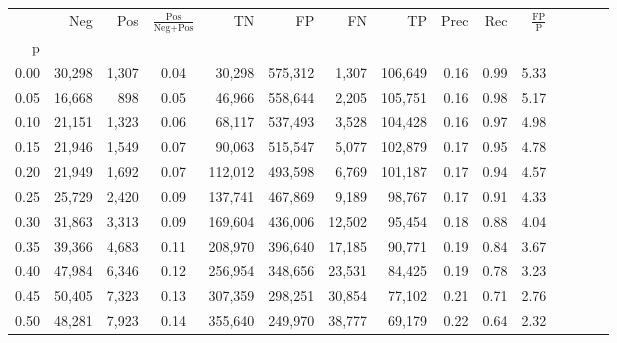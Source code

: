 \begin{tabular}{rrrcrrrrrrrrrrr}
\toprule
{} &     Neg &    Pos & $\frac{\text{Pos}}{\text{Neg}+\text{Pos}}$ &       TN &       FP &       FN &       TP &  Prec &   Rec & $\frac{\text{FP}}{\text{P}}$ \\
p    &         &        &                                            &          &          &          &          &       &       &                              \\
\midrule
0.00 &  30,298 &  1,307 &                                       0.04 &   30,298 &  575,312 &    1,307 &  106,649 &  0.16 &  0.99 &                         5.33 \\
0.05 &  16,668 &    898 &                                       0.05 &   46,966 &  558,644 &    2,205 &  105,751 &  0.16 &  0.98 &                         5.17 \\
0.10 &  21,151 &  1,323 &                                       0.06 &   68,117 &  537,493 &    3,528 &  104,428 &  0.16 &  0.97 &                         4.98 \\
0.15 &  21,946 &  1,549 &                                       0.07 &   90,063 &  515,547 &    5,077 &  102,879 &  0.17 &  0.95 &                         4.78 \\
0.20 &  21,949 &  1,692 &                                       0.07 &  112,012 &  493,598 &    6,769 &  101,187 &  0.17 &  0.94 &                         4.57 \\
0.25 &  25,729 &  2,420 &                                       0.09 &  137,741 &  467,869 &    9,189 &   98,767 &  0.17 &  0.91 &                         4.33 \\
0.30 &  31,863 &  3,313 &                                       0.09 &  169,604 &  436,006 &   12,502 &   95,454 &  0.18 &  0.88 &                         4.04 \\
0.35 &  39,366 &  4,683 &                                       0.11 &  208,970 &  396,640 &   17,185 &   90,771 &  0.19 &  0.84 &                         3.67 \\
0.40 &  47,984 &  6,346 &                                       0.12 &  256,954 &  348,656 &   23,531 &   84,425 &  0.19 &  0.78 &                         3.23 \\
0.45 &  50,405 &  7,323 &                                       0.13 &  307,359 &  298,251 &   30,854 &   77,102 &  0.21 &  0.71 &                         2.76 \\
0.50 &  48,281 &  7,923 &                                       0.14 &  355,640 &  249,970 &   38,777 &   69,179 &  0.22 &  0.64 &                         2.32 \\

\end{tabular}
